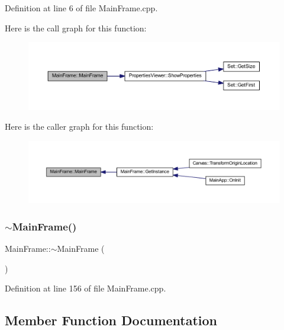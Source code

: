 Definition at line 6 of file Main\+Frame.\+cpp.

Here is the call graph for this function\+:
\nopagebreak
\begin{figure}[H]
\begin{center}
\leavevmode
\includegraphics[width=350pt]{class_main_frame_a00c85521dad6b24000967206bcc53688_cgraph}
\end{center}
\end{figure}
Here is the caller graph for this function\+:
\nopagebreak
\begin{figure}[H]
\begin{center}
\leavevmode
\includegraphics[width=350pt]{class_main_frame_a00c85521dad6b24000967206bcc53688_icgraph}
\end{center}
\end{figure}
\mbox{\label{class_main_frame_a0cfd88ece4836e0ea5430bd55370bf11}} 
\subsubsection{\texorpdfstring{$\sim$\+Main\+Frame()}{~MainFrame()}}
{\footnotesize\ttfamily Main\+Frame\+::$\sim$\+Main\+Frame (\begin{DoxyParamCaption}{ }\end{DoxyParamCaption})}



Definition at line 156 of file Main\+Frame.\+cpp.



\subsection{Member Function Documentation}
\mbox{\label{class_main_frame_a3d8d476c8bb68d83d5dc006abb442851}} 
